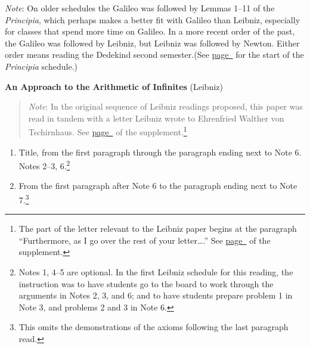 \documentclass[10pt]{article}
\begin{document}
{\small \emph{Note}: On older schedules the Galileo was followed by Lemmas 1--11 of the \emph{Principia}, which perhaps makes a better fit with Galileo than Leibniz, especially for classes that spend more time on Galileo. In a more recent order of the past, the Galileo was followed by Leibniz, but Leibniz was followed by Newton. Either order means reading the Dedekind second semester.(See \hyperref[NewtonStart]{page~\pageref{NewtonStart}} for the start of the \emph{Principia} schedule.)

}

\textbf{An Approach to the Arithmetic of Infinites} (Leibniz)
\label{LeibnizInfinites}
\vspace{-0.2em}
\begin{quote}
	\small{\emph{Note}: In the original sequence of Leibniz readings proposed, this paper was read in tandem with a letter Leibniz wrote to Ehrenfried Walther von Tschirnhaus. See
	\hyperref[supple.86]{page~\pageref{supple.86}} of the
	supplement.}\footnote{The part of the letter relevant to the Leibniz paper begins at the paragraph ``Furthermore, as I go over the rest of your letter\ldots.'' See \hyperref[supple.92]{page~\pageref{supple.92}} of the supplement.}
\end{quote}
\begin{enumerate}[resume*]
	\item Title, from the first paragraph through the paragraph ending next
		to Note 6. Notes 2--3, 6.\footnote{Notes 1, 4--5 are optional. In the first Leibniz schedule for this reading, the instruction was to have students go to the board to work through the arguments in Notes 2, 3, and 6; and to have students prepare problem 1 in Note 3, and problems 2 and 3 in Note 6.}
	\item From the first paragraph after
		Note 6 to the paragraph ending next to
		Note 7.\footnote{This omits the
			demonstrations of the axioms following the last paragraph read.}
\end{enumerate}
\end{document}
